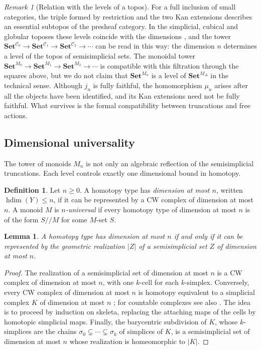 \documentclass[11pt]{amsart}
\newtheorem{lemma}[teo]{Lemma}
\theoremstyle{definition}
\newtheorem{definition}[teo]{Definition}
\theoremstyle{remark}
\newtheorem{remark}[teo]{Remark}
\numberwithin{figure}{section}%
\newcommand{\CC}{\mathcal{C}}
\newcommand{\Set}{\mathbf{Set}}
\begin{document}
\begin{remark}[Relation with the levels of a topos]
\label{rem:levels-topos}
For a full inclusion of small categories, the triple formed by restriction and the two Kan extensions describes an essential subtopos of the presheaf category. In the simplicial, cubical and globular toposes these levels coincide with the dimensions \cite{KennettRiehlRoyZaks2011}, and the tower $\Set^{\CC_0}\to\Set^{\CC_1}\to\Set^{\CC_2}\to\cdots$ can be read in this way: the dimension $n$ determines a level of the topos of semisimplicial sets. The monoidal tower $\Set^{M_0}\to\Set^{M_1}\to\Set^{M_2}\to\cdots$ is compatible with this filtration through the squares above, but we do not claim that $\Set^{M_n}$ is a level of $\Set^{M_\Delta}$ in the technical sense. Although $j_n$ is fully faithful, the homomorphism $\mu_n$ arises after all the objects have been identified, and its Kan extensions need not be fully faithful. What survives is the formal compatibility between truncations and free actions.
\end{remark}

\subsection{Dimensional universality}
\label{subsec:dimensional-universality}

The tower of monoids $M_n$ is not only an algebraic reflection of the semisimplicial truncations. Each level controls exactly one dimensional bound in homotopy.

\begin{definition}
Let $n\geq0$. A homotopy type has \emph{dimension at most $n$}, written $\operatorname{hdim}(Y)\leq n$, if it can be represented by a CW complex of dimension at most $n$. A monoid $M$ is \emph{$n$-universal} if every homotopy type of dimension at most $n$ is of the form $S/\!/M$ for some $M$-set $S$.
\end{definition}

\begin{lemma}
\label{lem:semisimplicial-models}
A homotopy type has dimension at most $n$ if and only if it can be represented by the geometric realization $|Z|$ of a semisimplicial set $Z$ of dimension at most $n$.
\end{lemma}

\begin{proof}
The realization of a semisimplicial set of dimension at most $n$ is a CW complex of dimension at most $n$, with one $k$-cell for each $k$-simplex. Conversely, every CW complex of dimension at most $n$ is homotopy equivalent to a simplicial complex $K$ of dimension at most $n$ \cite[Thm.~2C.5]{Hatcher}; for countable complexes see also \cite[Thm.~13]{Whitehead}.
The idea is to proceed by induction on skeleta, replacing the attaching maps of the cells by homotopic simplicial maps. Finally, the barycentric subdivision of $K$, whose $k$-simplices are the chains $\sigma_0\subsetneq\cdots\subsetneq\sigma_k$ of simplices of $K$, is a semisimplicial set of dimension at most $n$ whose realization is homeomorphic to $|K|$.
\end{proof}
\end{document}
